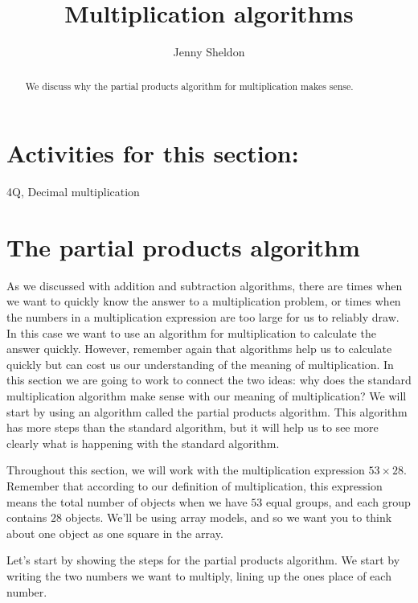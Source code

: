\documentclass{ximera}
\title{Multiplication algorithms}
\author{Jenny Sheldon}
\begin{document}
\begin{abstract}
We discuss why the partial products algorithm for multiplication makes sense.
\end{abstract}
\maketitle

\section{Activities for this section:} 4Q, Decimal multiplication

\section{The partial products algorithm}

As we discussed with addition and subtraction algorithms, there are times when we want to quickly know the answer to a multiplication problem, or times when the numbers in a multiplication expression are too large for us to reliably draw. In this case we want to use an algorithm for multiplication to calculate the answer quickly. However, remember again that algorithms help us to calculate quickly but can cost us our understanding of the meaning of multiplication. In this section we are going to work to connect the two ideas: why does the standard multiplication algorithm make sense with our meaning of multiplication? We will start by using an algorithm called the partial products algorithm. This algorithm has more steps than the standard algorithm, but it will help us to see more clearly what is happening with the standard algorithm.

Throughout this section, we will work with the multiplication expression $53 \times 28$. Remember that according to our definition of multiplication, this expression means the total number of objects when we have $53$ equal groups, and each group contains $28$ objects. We'll be using array models, and so we want you to think about one object as one square in the array.

Let's start by showing the steps for the partial products algorithm. We start by writing the two numbers we want to multiply, lining up the ones place of each number.

\begin{center}
\end{center}
\end{document}
